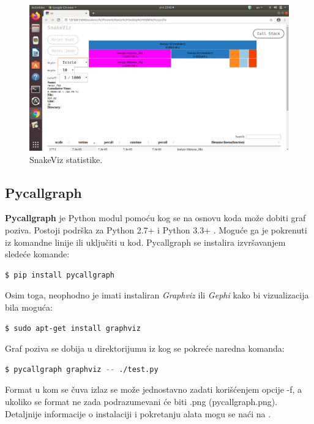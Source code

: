 \documentclass[a4paper]{article}
\begin{document}
\begin{figure}[h!]
\begin{center}
\includegraphics[trim={3cm 7.5cm 35cm 14cm},clip,scale=0.55]{MVJ_02_ProfajleriZaPython_ZecevicSmiljanicMilovanovicPopov/snakeviz2.png}
\end{center}
\caption{SnakeViz statistike.}
\label{fig:snake_viz_2}
\end{figure}
    
\subsection{Pycallgraph}
\label{profajler_4}
\textbf{Pycallgraph} je Python modul pomoću kog se na osnovu koda može dobiti graf poziva. Postoji podrška za Python 2.7+ i Python 3.3+ \cite{Pycallgraph}.
Moguće ga je pokrenuti iz komandne linije ili uključiti u kod.
Pycallgraph se instalira izvršavanjem sledeće komande:
\begin{lstlisting}[language=bash, belowskip=-\baselineskip]
  $ pip install pycallgraph
\end{lstlisting}
Osim toga, neophodno je imati instaliran {\em Graphviz} ili {\em Gephi} kako bi vizualizacija bila moguća:
\begin{lstlisting}[language=bash, belowskip=-\baselineskip]
  $ sudo apt-get install graphviz
\end{lstlisting}
Graf poziva se dobija u direktorijumu iz kog se pokreće naredna komanda:
\begin{lstlisting}[language=bash,frame=single, label=lst:pycallgraph, belowskip=-\baselineskip]
  $ pycallgraph graphviz -- ./test.py 
\end{lstlisting}
Format u kom se čuva izlaz se može jednostavno zadati korišćenjem opcije -f, a ukoliko se format ne zada podrazumevani će biti .png (pycallgraph.png). 
Detaljnije informacije o instalaciji i pokretanju alata mogu se naći na \cite{Pycallgraph}.
\end{document}
